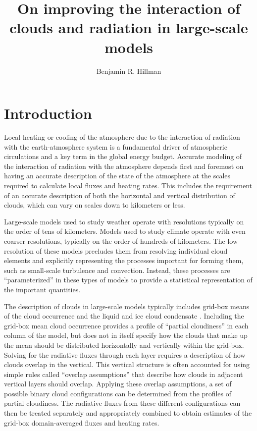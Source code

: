 \documentclass{article}
\author{Benjamin R. Hillman}
\title{On improving the interaction of clouds and radiation in large-scale models}
\begin{document}
\linenumbers
\maketitle
\section{Introduction}
Local heating or cooling of the atmosphere due to the interaction of radiation with the earth-atmosphere system is a fundamental driver of atmospheric circulations and a key term in the global energy budget. Accurate modeling of the interaction of radiation with the atmosphere depends first and foremost on having an accurate description of the state of the atmosphere at the scales required to calculate local fluxes and heating rates. This includes the requirement of an accurate description of both the horizontal and vertical distribution of clouds, which can vary on scales down to kilometers or less.

Large-scale models used to study weather operate with resolutions typically on the order of tens of kilometers. Models used to study climate operate with even coarser resolutions, typically on the order of hundreds of kilometers. The low resolution of these models precludes them from resolving individual cloud elements and explicitly representing the processes important for forming them, such as small-scale turbulence and convection. Instead, these processes are ``parameterized'' in these types of models to provide a statistical representation of the important quantities.

The description of clouds in large-scale models typically includes grid-box means of the cloud occurrence and the liquid and ice cloud condensate \citep[e.g.][]{cam3_description,cam4_description}. Including the grid-box mean cloud occurrence provides a profile of ``partial cloudiness'' in each column of the model, but does not in itself specify how the clouds that make up the mean should be distributed horizontally and vertically within the grid-box. Solving for the radiative fluxes through each layer requires a description of how clouds overlap in the vertical. This vertical structure is often accounted for using simple rules called ``overlap assumptions'' \citep[e.g.][]{collins_2001} that describe how clouds in adjacent vertical layers should overlap. Applying these overlap assumptions, a set of possible binary cloud configurations can be determined from the profiles of partial cloudiness. The radiative fluxes from these different configurations can then be treated separately and appropriately combined to obtain estimates of the grid-box domain-averaged fluxes and heating rates. 
\end{document}
